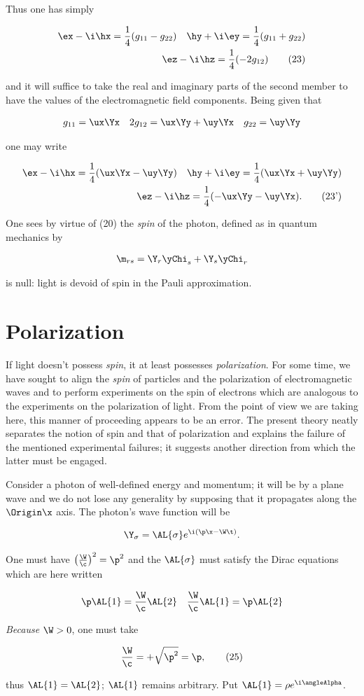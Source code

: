 \documentclass{article}
\newcommand{\nequ}[2]{
\begin{align*}
#1
\tag{#2}
\end{align*}
}
\newcommand{\uequ}[1]{
\begin{align*}
#1
\end{align*}
}
\newcommand{\var}[1]{#1}
\newcommand{\const}[1]{#1}
\newcommand{\inv}[1]{\frac{1}{#1}}
\renewcommand{\it}[1]{\textit{#1}}
\renewcommand{\exp}[1]{\const{e}^{#1}}
\newcommand{\gLL}[2]{\var{g}_{{#1}{#2}}}
\begin{document}
\begin{multicols}{2}
Thus one has simply
\nequ{
\ex - \i\hx = \inv{4}(\gLL{1}{1} - \gLL{2}{2})\quad\hy + \i\ey = \inv{4}(\gLL{1}{1}+\gLL{2}{2})\\
\ez-\i\hz = \inv{4}(-2\gLL{1}{2})
}{23}
and it will suffice to take the real and imaginary parts of the second member to have the values of the electromagnetic field components. Being given that
\uequ{
\gLL{1}{1} = \ux\Yx \quad
2\gLL{1}{2} = \ux\Yy + \uy\Yx \quad
\gLL{2}{2} = \uy\Yy
}
one may write
\nequ{
\ex - \i\hx = \inv{4}(\ux\Yx - \uy\Yy)\quad \hy + \i\ey = \inv{4}(\ux\Yx + \uy\Yy)\\
\ez-\i\hz=\inv{4}(-\ux\Yy - \uy\Yx).
}{23'}

One sees by virtue of (20) the \it{spin} of the photon, defined as in quantum mechanics by
\uequ{
\m_{rs} = \Y_r\yChi_s +
\Y_s\yChi_r}

is null: light is devoid of spin in the Pauli approximation.

\section{Polarization}
If light doesn't possess \it{spin}, it at least possesses \it{polarization}. For some time, we have sought to align the \it{spin} of particles and the polarization of electromagnetic waves and to perform experiments on the spin of electrons which are analogous to the experiments on the polarization of light. From the point of view we are taking here, this manner of proceeding appears to be an error. The present theory neatly separates the notion of spin and that of polarization and explains the failure of the mentioned experimental failures; it suggests another direction from which the latter must be engaged.

Consider a photon of well-defined energy and momentum; it will be by a plane wave and we do not lose any generality by supposing that it propagates along the $\Origin\x$ axis. The photon's wave function will be
\uequ{
\Y_\sigma = \AL{\sigma}\exp{\i(\p\x - \W\t)}.
}

One must have $\left(\frac{\W}{\c}\right)^2 = \p^2$ and the $\AL{\sigma}$ must satisfy the Dirac equations which are here written
\uequ{
\p\AL{1}=\frac{\W}{\c}\AL{2}\quad \frac{\W}{\c}\AL{1} = \p\AL{2}
}
\it{Because} $\W > 0$, one must take
\nequ{
\frac{\W}{\c} = +\sqrt{\p^2} = \p,
}{25}
thus $\AL{1} = \AL{2}$; $\AL{1}$ remains arbitrary. Put $\AL{1} = \rho\exp{\i\angleAlpha}$.


\end{multicols}
\end{document}
